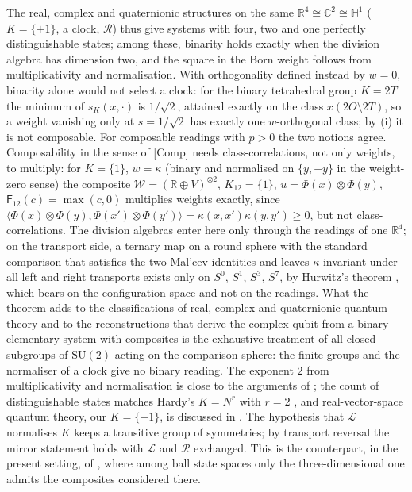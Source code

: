\documentclass[aps,pra,onecolumn,superscriptaddress,nofootinbib,10pt]{revtex4-2}
\theoremstyle{definition}
\theoremstyle{remark}
\newcommand{\R}{\mathbb{R}}
\newcommand{\C}{\mathbb{C}}
\newcommand{\HH}{\mathbb{H}}
\newcommand{\cL}{\mathcal{L}}
\newcommand{\cR}{\mathcal{R}}
\newcommand{\ip}[2]{\langle #1,#2\rangle}
\newcommand{\SU}{\mathrm{SU}}
\begin{document}
The real, complex and quaternionic structures on the same $\R^4\cong\C^2\cong\HH^1$ ($K=\{\pm1\}$, a clock,
$\cR$) thus give systems with four, two and one perfectly distinguishable states; among these, binarity
holds exactly when the division algebra has dimension two, and the square in the Born weight follows
from multiplicativity and normalisation.  With orthogonality defined instead by $w=0$, binarity alone would
not select a clock: for the binary tetrahedral group $K=2T$ the minimum of $s_K(x,\cdot)$ is $1/\sqrt2$, attained
exactly on the class $x(2O\setminus2T)$, so a weight vanishing only at $s=1/\sqrt2$ has exactly one $w$-orthogonal
class; by (i) it is not composable.  For composable readings with $p>0$ the two notions agree.  Composability in the sense of [Comp] needs class-correlations, not only weights, to
multiply: for $K=\{1\}$, $w=\kappa$ (binary and normalised on $\{y,-y\}$ in the weight-zero sense) the composite
$\mathcal W=(\R\oplus V)^{\otimes2}$, $K_{12}=\{1\}$, $u=\Phi(x)\otimes\Phi(y)$, $\mathsf F_{12}(c)=\max(c,0)$ multiplies weights
exactly, since $\ip{\Phi(x)\otimes\Phi(y)}{\Phi(x')\otimes\Phi(y')}=\kappa(x,x')\kappa(y,y')\ge0$, but not
class-correlations.  The division algebras enter here only through the readings of one $\R^4$; on the transport side,
a ternary map on a round sphere with the standard comparison that satisfies the two Mal'cev identities
and leaves $\kappa$ invariant under all left and right transports exists only on $S^0$, $S^1$, $S^3$, $S^7$, by
Hurwitz's theorem \cite[Prop.~5.13]{PaperI}, which bears on the configuration space and not on the readings.
What the theorem adds to the classifications of real, complex and quaternionic
quantum theory \cite{Dyson62,Baez12,Adler95} and to the reconstructions that derive the complex qubit from
a binary elementary system with composites \cite{DB,BruknerZeilinger09,HoehnWever17,MMAP,MMPA14,BGW20} is
the exhaustive treatment of all closed subgroups of $\SU(2)$ acting on the comparison sphere: the finite
groups and the normaliser of a clock give no binary reading.  The exponent $2$ from
multiplicativity and normalisation is close to the arguments of \cite{Aaronson04,GalleyMasanes17}; the
count of distinguishable states matches Hardy's $K=N^r$ with $r=2$ \cite{Hardy}, and real-vector-space
quantum theory, our $K=\{\pm1\}$, is discussed in \cite{Wootters12}.  The hypothesis that $\cL$ normalises $K$ keeps a
transitive group of symmetries; by transport reversal the mirror statement holds with $\cL$ and $\cR$
exchanged.  This is the counterpart, in the present setting, of \cite{MMAP,MMPA14}, where among ball
state spaces only the three-dimensional one admits the composites considered there.
\end{document}
